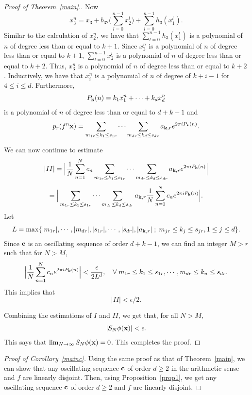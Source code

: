 \documentclass[12pt,letterpaper]{amsart}
\begin{document}
\begin{proof}[Proof of Theorem~\ref{main}.]
Now
$$
x_{3}^{n} = x_{3} +b_{32} \Big( \sum_{l=0}^{n-1} x_{2}^{l} \Big) +\sum_{l=0}^{n-1} h_{3} (x_{1}^{l}).
$$
Similar to the calculation of $x_{2}^{n}$, we have that $\sum_{l=0}^{n-1} h_{3} (x_{1}^{l})$ is a polynomial of $n$ of degree less than or equal to $k+1$. Since $x_{2}^{n}$ is a polynomial of $n$ of degree less than or equal to $k+1$, $\sum_{l=0}^{n-1} x_{2}^{l}$ is a polynomial of $n$ of degree less than or equal to $k+2$. Thus, $x_{3}^{n}$ is a polynomial of $n$ of degree less than or equal to $k+2$. 
Inductively, we have that $x_{i}^{n}$ is a polynomial of $n$ of degree of $k+i-1$ for $4\leq i\leq d$. Furthermore,
$$
P_{{\bf k}} (n) = k_{1}x_{1}^{n}+\cdots +k_{d}x_{d}^{n}
$$
is a polynomial of $n$ of degree less than or equal to $d+k-1$ and 
$$
p_{r} (f^{n} {\bf x}) =  
\sum_{m_{1r} \leq k_{1}\leq s_{1r}} \cdots \sum_{ m_{dr} \leq k_{d}\leq s_{dr}} a_{{\bf k},r} e^{2\pi i P_{{\bf k}} (n)}.
$$

We can now continue to estimate 
$$
|II| =\Big|\frac{1}{N} \sum_{n=1}^{N} c_{n} \sum_{m_{1r} \leq k_{1}\leq s_{1r}} \cdots \sum_{m_{dr}\leq k_{d}\leq s_{dr}} a_{{\bf k},r} e^{2\pi i P_{{\bf k}} (n)}\Big| 
$$
$$
= \Big |\sum_{m_{1r}\leq k_{1}\leq s_{1r}}\cdots \sum_{m_{dr}\leq k_{d}\leq s_{dr}} a_{{\bf k},r} \frac{1}{N} \sum_{n=1}^{N} c_{n} e^{2\pi i P_{{\bf k}} (n)} \Big|.
$$
Let 
$$
L=\max \{ |m_{1r}|, \cdots, |m_{dr}|, |s_{1r}|, \cdots, |s_{dr}|, |a_{{\bf k},r}| \; ; \; m_{jr} \leq k_{j}\leq s_{jr}, 1\leq j\leq d\}.
$$
Since ${\bf c}$ is an oscillating sequence of order $d+k-1$, we can find an integer $M>r$ such that for $N>M$,
$$
\Big|\frac{1}{N} \sum_{n=1}^{N} c_{n} e^{2\pi i P_{{\bf k}} (n)} \Big|< \frac{\epsilon}{2L^{d}}, \quad \forall\; m_{1r} \leq k_{1}\leq s_{1r}, \cdots, m_{dr}\leq k_{n}\leq s_{dr}.
$$
This implies that 
$$
|II|< \epsilon/2.
$$

Combining the estimations of $I$ and $II$, we get that, for all $N>M$,
$$
|S_{N}\phi ({\bf x})|< \epsilon.
$$
This says that $\lim_{N\to \infty} S_{N}\phi({\bf x}) =0$. 
This completes the proof.
\end{proof}

\begin{proof}[Proof of Corollary~\ref{mainc}]
Using the same proof as that of Theorem~\ref{main}, we can show that any oscillating sequence ${\bf c}$ of order $d\geq 2$ in the arithmetic sense and $f$ are linearly disjoint. Then, using Proposition~\ref{prop1}, we get any oscillating sequence ${\bf c}$ of order $d\geq 2$ and $f$ are linearly disjoint. 
\end{proof}
\end{document}
